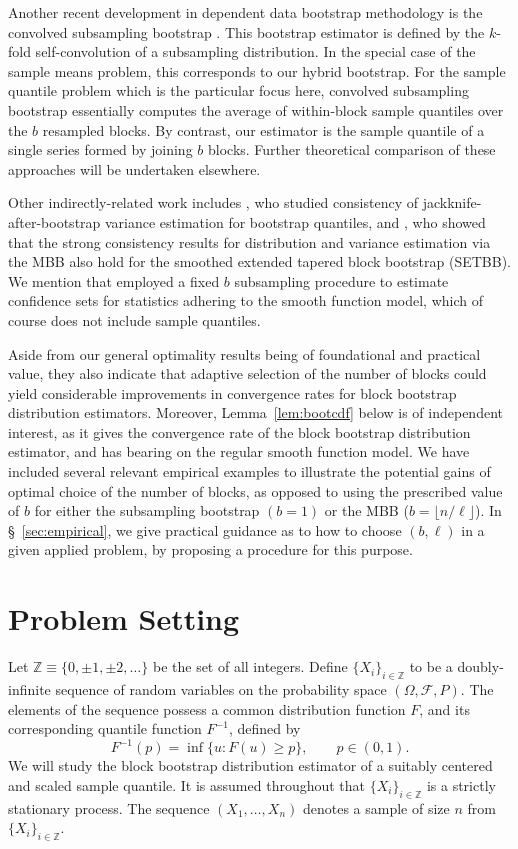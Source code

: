 \documentclass[a4paper, 12pt]{article}
\theoremstyle{plain}
\theoremstyle{definition}
\begin{document}
Another recent development in dependent data bootstrap methodology is the convolved subsampling bootstrap \citep{TPN:2017}. This bootstrap estimator is defined by the $k$-fold self-convolution of a subsampling distribution. In the special case of the sample means problem, this corresponds to our hybrid bootstrap. For the sample quantile problem which is the particular focus here, convolved subsampling bootstrap essentially computes the average of within-block sample quantiles over the $b$ resampled blocks. By contrast, our estimator is the sample quantile of a single series formed by joining $b$ blocks. Further theoretical comparison of these approaches will be undertaken elsewhere. 

Other indirectly-related work includes \citet{Lahiri:2005}, who studied consistency of jackknife-after-bootstrap variance estimation for bootstrap quantiles, and \citet{GLN:2015}, who showed that the \citet{SunLahiri:2006} strong consistency results for distribution and variance estimation via the MBB also hold for the smoothed extended tapered block bootstrap (SETBB). We mention that \citet{ShaoPolitis:2013} employed a fixed $b$ subsampling procedure to estimate confidence sets for statistics adhering to the smooth function model, which of course does not include sample quantiles.

Aside from our general optimality results being of foundational and practical value, they also indicate that adaptive selection of the number of blocks could yield considerable improvements in convergence rates for block bootstrap distribution estimators. Moreover, Lemma~\ref{lem:bootcdf} below is of independent interest, as it gives the convergence rate of the block bootstrap distribution estimator, and has bearing on the regular smooth function model. We have included several relevant empirical examples to illustrate the potential gains of optimal choice of the number of blocks, as opposed to using the prescribed value of $b$ for either the subsampling bootstrap $(b=1)$ or the MBB ($b=\lfloor n/\ell \rfloor$). In \S~\ref{sec:empirical}, we give practical guidance as to how to choose $(b,\ell)$ in a given applied problem, by proposing a procedure for this purpose.


\section{Problem Setting}
\label{sec:setting}


Let $\mathbb{Z} \equiv \{0, \pm 1, \pm 2, \ldots \}$ be the set of all integers. Define $\{X_{i}\}_{i \in \mathbb{Z}}$ to be a doubly-infinite sequence of random variables on the probability space $(\Omega, \mathcal{F}, P)$. The elements of the sequence possess a common distribution function $F$, and its corresponding quantile function $F^{-1}$, defined by 
\[
F^{-1}(p)=\inf\{u : F(u) \geq p\}, \qquad p \in (0,1).
\]
We will study the block bootstrap distribution estimator of a suitably centered and scaled sample quantile. It is assumed throughout that $\{X_{i}\}_{i \in \mathbb{Z}}$ is a strictly stationary process. The sequence $(X_{1}, \ldots, X_{n})$ denotes a sample of size $n$ from $\{X_{i}\}_{i \in \mathbb{Z}}$. 
\end{document}
